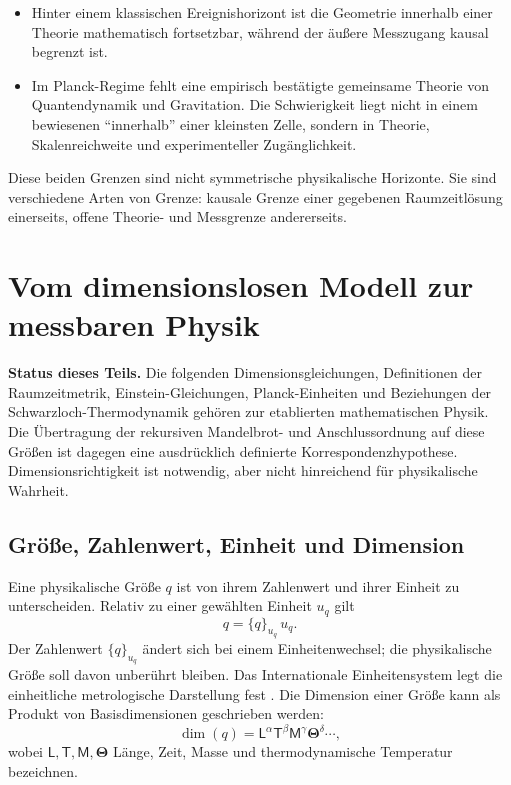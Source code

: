 \documentclass[11pt,a4paper]{article}
\theoremstyle{remark}
\newcommand{\statusbox}[2]{%
  \par\medskip\noindent
  \colorbox{#1}{\parbox{\dimexpr\linewidth-2\fboxsep\relax}{#2}}%
  \par\medskip
}
\begin{document}
\begin{itemize}
  \item Hinter einem klassischen Ereignishorizont ist die Geometrie innerhalb
  einer Theorie mathematisch fortsetzbar, während der äußere Messzugang kausal
  begrenzt ist.
  \item Im Planck-Regime fehlt eine empirisch bestätigte gemeinsame Theorie
  von Quantendynamik und Gravitation. Die Schwierigkeit liegt nicht in einem
  bewiesenen ``innerhalb'' einer kleinsten Zelle, sondern in Theorie,
  Skalenreichweite und experimenteller Zugänglichkeit.
\end{itemize}

Diese beiden Grenzen sind nicht symmetrische physikalische Horizonte. Sie sind
verschiedene Arten von Grenze: kausale Grenze einer gegebenen Raumzeitlösung
einerseits, offene Theorie- und Messgrenze andererseits.

\section{Vom dimensionslosen Modell zur messbaren Physik}
\label{sec:dimensionsbruecke}

\statusbox{QLight}{
\textbf{Status dieses Teils.}
Die folgenden Dimensionsgleichungen, Definitionen der Raumzeitmetrik,
Einstein-Gleichungen, Planck-Einheiten und Beziehungen der
Schwarzloch-Thermodynamik gehören zur etablierten mathematischen Physik. Die
Übertragung der rekursiven Mandelbrot- und Anschlussordnung auf diese Größen
ist dagegen eine ausdrücklich definierte Korrespondenzhypothese.
Dimensionsrichtigkeit ist notwendig, aber nicht hinreichend für physikalische
Wahrheit.
}

\subsection{Größe, Zahlenwert, Einheit und Dimension}

Eine physikalische Größe \(q\) ist von ihrem Zahlenwert und ihrer Einheit zu
unterscheiden. Relativ zu einer gewählten Einheit \(u_q\) gilt
\[
  q=\{q\}_{u_q}\,u_q.
\]
Der Zahlenwert \(\{q\}_{u_q}\) ändert sich bei einem Einheitenwechsel; die
physikalische Größe soll davon unberührt bleiben. Das Internationale
Einheitensystem legt die einheitliche metrologische Darstellung fest
\citep{bipm2026si}. Die Dimension einer Größe kann als Produkt von
Basisdimensionen geschrieben werden:
\[
  \dim(q)=\mathsf L^{\alpha}\mathsf T^{\beta}\mathsf M^{\gamma}
  \boldsymbol\Theta^{\delta}\cdots,
\]
wobei \(\mathsf L,\mathsf T,\mathsf M,\boldsymbol\Theta\) Länge, Zeit,
Masse und thermodynamische Temperatur bezeichnen.
\end{document}
